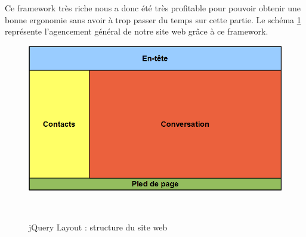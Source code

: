 Ce framework très riche nous a donc été très profitable pour pouvoir obtenir une bonne ergonomie sans avoir
à trop passer du temps sur cette partie.
Le schéma \ref{siteWeb_jQueryLayout} représente l'agencement général de notre site web grâce à ce framework.

\begin{figure}[!h]
	\center
	\includegraphics[width=13cm]{img/siteWeb_jQueryLayout.png}
	\caption{jQuery Layout : structure du site web}
	\label{siteWeb_jQueryLayout}
~~\\
\end{figure}
